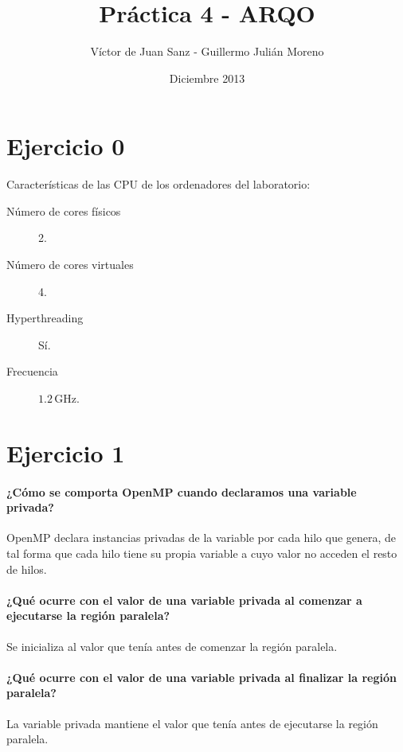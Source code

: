 \documentclass{apuntes}
\title{Pr\'{a}ctica 4 - ARQO}
\date{Diciembre 2013}
\author{V\'{i}ctor de Juan Sanz - Guillermo Juli\'{a}n Moreno}
\begin{document}
\maketitle
\newpage

\pagestyle{plain}

\section*{Ejercicio 0}

Características de las CPU de los ordenadores del laboratorio:

\begin{description}
\item[Número de cores físicos] 2.
\item[Número de cores virtuales] 4.
\item[Hyperthreading] Sí.
\item[Frecuencia] $1.2\,\mathrm{GHz}$.
\end{description}

\section*{Ejercicio 1}

\paragraph{¿Cómo se comporta OpenMP cuando declaramos una variable privada?} 

OpenMP declara instancias privadas de la variable por cada hilo que genera, de tal forma que cada hilo tiene su propia variable a cuyo valor no acceden el resto de hilos.

\paragraph{¿Qué ocurre con el valor de una variable privada al comenzar a ejecutarse la región paralela?} 

Se inicializa al valor que tenía antes de comenzar la región paralela.

\paragraph{¿Qué ocurre con el valor de una variable privada al finalizar la región paralela?}

La variable privada mantiene el valor que tenía antes de ejecutarse la región paralela.
\end{document}
